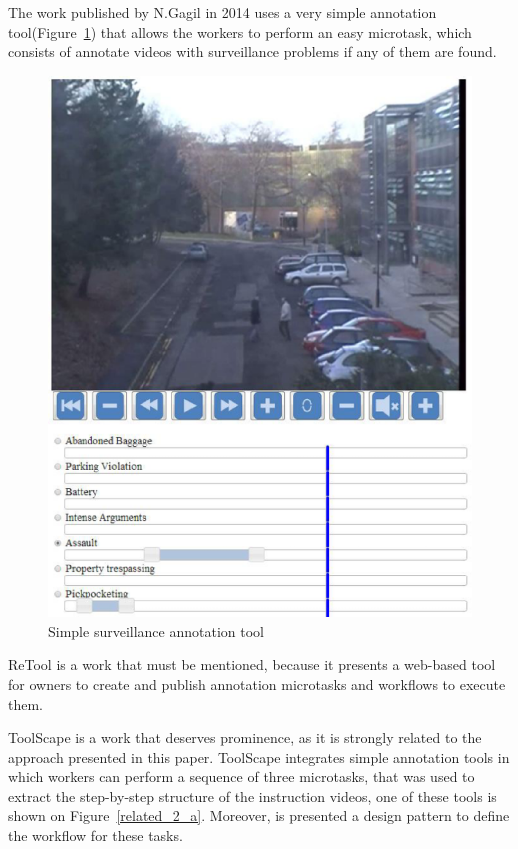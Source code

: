 The work published by N.Gagil in 2014\cite{gadgil2014web} uses a very simple annotation tool(Figure~\ref{related_d}) that allows the workers to perform an easy microtask, which consists of annotate videos with surveillance problems if any of them are found.

\begin{figure}[h]
	\centerline{\includegraphics[scale=0.3] {figure/related_d}}
	\caption{Simple surveillance annotation tool\cite{gadgil2014web}}
	\label{related_d}
\end{figure} 

ReTool\cite{Chen:2017:RIM:3025453.3025969} is a work that must be mentioned, because it presents a web-based tool for owners to create and publish annotation microtasks and workflows to execute them.

ToolScape\cite{Kim:2014:JSL:2679600.2680027} is a work that deserves prominence, as it is strongly related to the approach presented in this paper. ToolScape integrates simple annotation tools in which workers can perform a sequence of three microtasks, that was used to extract the step-by-step structure of the instruction videos, one of these tools is shown on Figure~\ref{related_2_a}. Moreover, is presented a design pattern to define the workflow for these tasks.

